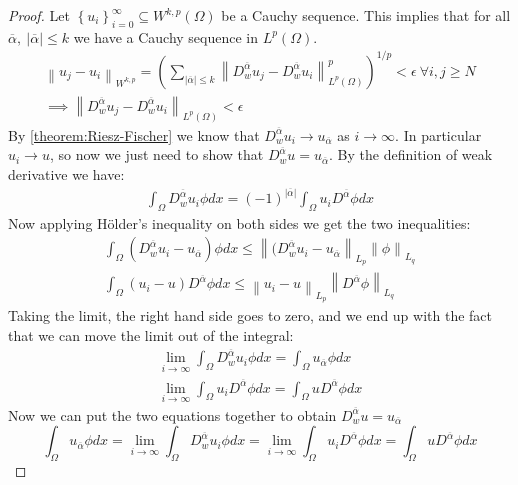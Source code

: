 \documentclass[../Main/main.tex]{subfiles}
\begin{document}
	\begin{proof}
		Let $\left \{  u_i\right \}_{i=0}^{\infty} \subseteq W^{k,p}(\Omega)$ be a Cauchy sequence. This implies that for all $\overline{\alpha}, \  |\overline{\alpha}| \leq k$ we have a Cauchy sequence in $L^p(\Omega)$.
		\begin{gather*}
			\left \| u_j -u_i \right \|_{W^{k,p}} =
			(\sum_{|\overline{\alpha}|\leq k} \left \| D_w^{\overline{\alpha}}u_j - D_w^{\overline{\alpha}}u_i \right \|_{L^p(\Omega)}^p)^{1/p}  < \epsilon \ \forall i,j \geq N \\
			\implies \left \| D_w^{\overline{\alpha}}u_j - D_w^{\overline{\alpha}}u_i \right \|_{L^p(\Omega)} < \epsilon
		\end{gather*}
		By \eqref{theorem:Riesz-Fischer} we know that $D_w^{\overline{\alpha}}u_i \rightarrow u_{\overline{\alpha}}$ as $i\rightarrow  \infty$. In particular $u_i \rightarrow u$, so now we just need to show that $D_w^{\overline{\alpha}}u =  u_{\overline{\alpha}}$. By the definition of weak derivative we have:
		\begin{gather*}
			\int_{\Omega} D_w^{\overline{\alpha}}u_i \phi dx = (-1)^{|\overline{\alpha}|} \int_{\Omega} u_i D^{\overline{\alpha}}\phi dx
		\end{gather*}
		Now applying Hölder's inequality on both sides we get the two inequalities:
		\begin{gather*}
			\int_{\Omega} (D_w^{\overline{\alpha}}u_i - u_{\overline{\alpha}}) \phi dx \leq \left \| (D_w^{\overline{\alpha}}u_i - u_{\overline{\alpha}} \right \|_{L_p} \left \| \phi \right \|_{L_q} \\
			\int_{\Omega} (u_i -u) D^{\overline{\alpha}}\phi dx \leq \left \|u_i -u  \right \|_{L_p} \left \| D^{\overline{\alpha}}\phi \right \|_{L_q}
		\end{gather*}
		Taking the limit, the right hand side goes to zero, and we end up with the fact that we can move the limit out of the integral:
		\begin{gather*}
			\lim_{i\rightarrow \infty} \int_{\Omega} D_w^{\overline{\alpha}}u_i \phi dx =  \int_{\Omega}u_{\overline{\alpha}} \phi dx \\
			\lim_{i\rightarrow \infty}\int_{\Omega} u_i D^{\overline{\alpha}}\phi dx = \int_{\Omega} u  D^{\overline{\alpha}}\phi dx
		\end{gather*}
		Now we can put the two equations together to obtain $D_w^{\overline{\alpha}}u =  u_{\overline{\alpha}}$
		\begin{equation*}
			\int_{\Omega}u_{\overline{\alpha}} \phi dx = \lim_{i\rightarrow \infty} \int_{\Omega} D_w^{\overline{\alpha}}u_i \phi dx = \lim_{i\rightarrow \infty}\int_{\Omega} u_i D^{\overline{\alpha}}\phi dx = \int_{\Omega} u  D^{\overline{\alpha}}\phi dx
		\end{equation*}
	\end{proof}
\end{document}

